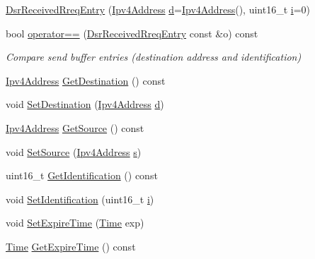 \begin{DoxyCompactItemize}
\item 
\hyperlink{classns3_1_1dsr_1_1DsrReceivedRreqEntry_aae7547181b93409f26a53f9fe0afb40e}{Dsr\+Received\+Rreq\+Entry} (\hyperlink{classns3_1_1Ipv4Address}{Ipv4\+Address} \hyperlink{lte__pathloss_8m_a1aabac6d068eef6a7bad3fdf50a05cc8}{d}=\hyperlink{classns3_1_1Ipv4Address}{Ipv4\+Address}(), uint16\+\_\+t \hyperlink{lte__uplink__power__control_8m_a6f6ccfcf58b31cb6412107d9d5281426}{i}=0)
\item 
bool \hyperlink{classns3_1_1dsr_1_1DsrReceivedRreqEntry_a95518366bab6328ea69d801e10b38f24}{operator==} (\hyperlink{classns3_1_1dsr_1_1DsrReceivedRreqEntry}{Dsr\+Received\+Rreq\+Entry} const \&o) const 
\begin{DoxyCompactList}\small\item\em Compare send buffer entries (destination address and identification) \end{DoxyCompactList}\item 
\hyperlink{classns3_1_1Ipv4Address}{Ipv4\+Address} \hyperlink{classns3_1_1dsr_1_1DsrReceivedRreqEntry_a40d89b04f0687e5071e0d9e117ccafed}{Get\+Destination} () const 
\item 
void \hyperlink{classns3_1_1dsr_1_1DsrReceivedRreqEntry_a7948ec91c3e512bab24e63b80bb87da1}{Set\+Destination} (\hyperlink{classns3_1_1Ipv4Address}{Ipv4\+Address} \hyperlink{lte__pathloss_8m_a1aabac6d068eef6a7bad3fdf50a05cc8}{d})
\item 
\hyperlink{classns3_1_1Ipv4Address}{Ipv4\+Address} \hyperlink{classns3_1_1dsr_1_1DsrReceivedRreqEntry_ac06965519c5c7fc6aad34ea728cc7094}{Get\+Source} () const 
\item 
void \hyperlink{classns3_1_1dsr_1_1DsrReceivedRreqEntry_a439d5ef7916b3b2963a0ba3ec0baf3bb}{Set\+Source} (\hyperlink{classns3_1_1Ipv4Address}{Ipv4\+Address} \hyperlink{generate__test__data__lte__sinr_8m_ad83eeb3a142285d1243a08c6b7026df8}{s})
\item 
uint16\+\_\+t \hyperlink{classns3_1_1dsr_1_1DsrReceivedRreqEntry_a3f7f8cc279ca840f07cb5354faef0637}{Get\+Identification} () const 
\item 
void \hyperlink{classns3_1_1dsr_1_1DsrReceivedRreqEntry_a214aec23dc93831d1feecfebd669936c}{Set\+Identification} (uint16\+\_\+t \hyperlink{lte__uplink__power__control_8m_a6f6ccfcf58b31cb6412107d9d5281426}{i})
\item 
void \hyperlink{classns3_1_1dsr_1_1DsrReceivedRreqEntry_a175ccc1fee274bce6cff95c8c9127756}{Set\+Expire\+Time} (\hyperlink{classns3_1_1Time}{Time} exp)
\item 
\hyperlink{classns3_1_1Time}{Time} \hyperlink{classns3_1_1dsr_1_1DsrReceivedRreqEntry_a6fe4af3cda61b3a37c78cd7d56c02101}{Get\+Expire\+Time} () const 
\end{DoxyCompactItemize}
